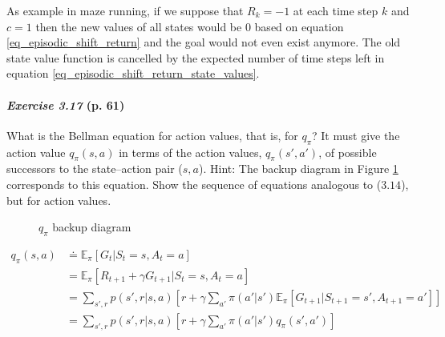 \documentclass[10pt,a4paper]{article}
\begin{document}
As example in maze running, if we suppose that $R_k = -1$ at each time step $k$ and $c = 1$ then the new values of all states would be $0$ based on equation \ref{eq_episodic_shift_return} and the goal would not even exist anymore. The old state value function is cancelled by the expected number of time steps left in equation \ref{eq_episodic_shift_return_state_values}.


\clearpage
\paragraph{\textit{Exercise 3.17} (p. 61)} What is the Bellman equation for action values, that is, for $q_\pi$? It must give the action value $q_\pi(s, a)$ in terms of the action values, $q_\pi(s', a')$, of possible successors to the state–action pair ($s, a$).
Hint: The backup diagram in Figure  \ref{bellman_eq_action_val} corresponds to this equation.
Show the sequence of equations analogous to ($3.14$), but for action
values.


\begin{figure}[h]
\centering
{}
\caption{$q_\pi$ backup diagram}
\label{bellman_eq_action_val}
\end{figure}

\begin{equation}
\begin{split}
q_\pi(s, a) &\doteq \mathbb{E}_\pi[G_t \lvert S_t = s, A_t = a]\\
&= \mathbb{E}_\pi[R_{t+1} + \gamma G_{t+1}\lvert S_t = s, A_t = a]\\
&= \sum_{s', r} p(s', r \lvert s, a) \left[r + \gamma \sum_{a'} \pi(a' \lvert s') \mathbb{E}_\pi[G_{t+1} \lvert S_{t+1} = s', A_{t+1} = a']\right]\\
&= \sum_{s', r} p(s', r \lvert s, a) \left[r + \gamma \sum_{a'} \pi(a' \lvert s') q_\pi(s', a')\right]
\end{split}
\end{equation}
\end{document}
